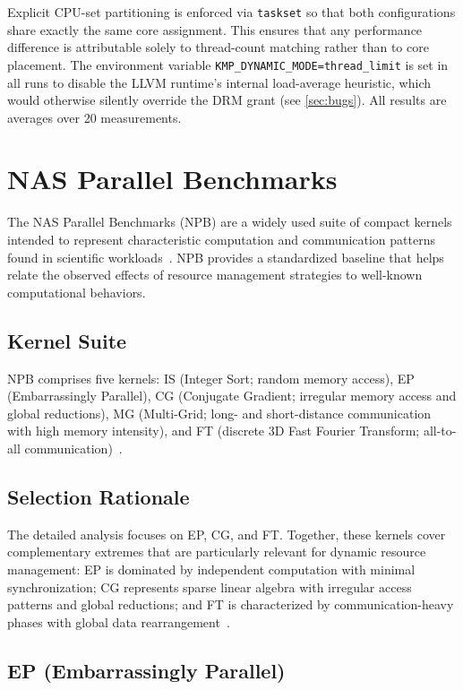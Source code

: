Explicit CPU-set partitioning is enforced via \texttt{taskset} so that both configurations share exactly the same core assignment. This ensures that any performance difference is attributable solely to thread-count matching rather than to core placement. The environment variable \texttt{KMP\_DYNAMIC\_MODE=thread\_limit} is set in all runs to disable the LLVM runtime's internal load-average heuristic, which would otherwise silently override the DRM grant (see \autoref{sec:bugs}). All results are averages over 20 measurements.

\section{NAS Parallel Benchmarks}

The NAS Parallel Benchmarks (NPB) are a widely used suite of compact kernels intended to represent characteristic computation and communication patterns found in scientific workloads~\parencite{noauthor_nas_nodate}. NPB provides a standardized baseline that helps relate the observed effects of resource management strategies to well-known computational behaviors.

\subsection{Kernel Suite}

NPB comprises five kernels: IS (Integer Sort; random memory access), EP (Embarrassingly Parallel), CG (Conjugate Gradient; irregular memory access and global reductions), MG (Multi-Grid; long- and short-distance communication with high memory intensity), and FT (discrete 3D Fast Fourier Transform; all-to-all communication)~\parencite{noauthor_nas_nodate}.

\subsection{Selection Rationale}

The detailed analysis focuses on EP, CG, and FT\@. Together, these kernels cover complementary extremes that are particularly relevant for dynamic resource management: EP is dominated by independent computation with minimal synchronization; CG represents sparse linear algebra with irregular access patterns and global reductions; and FT is characterized by communication-heavy phases with global data rearrangement~\parencite{jin_openmp_nodate}.

\subsection{EP (Embarrassingly Parallel)}

